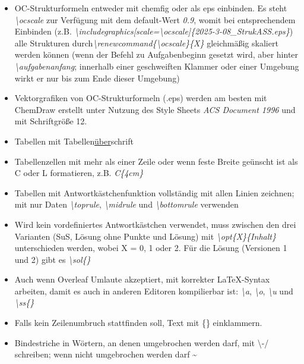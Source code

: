 \documentclass[./main.tex]{subfiles}
\begin{document}
\begin{itemize}
    \item OC-Strukturformeln entweder mit chemfig oder als eps einbinden. Es steht \textit{\textbackslash ocscale} zur Verf\"ugung mit dem default-Wert \textit{0.9}, womit bei entsprechendem Einbinden (z.B. \linebreak\textit{\textbackslash includegraphics[scale=\textbackslash ocscale]\{2025-3-08\_StrukASS.eps\}}) alle Strukturen durch\linebreak \textit{\textbackslash renewcommand\{\textbackslash ocscale\}\{X\}} gleichm\"a\ss{}ig skaliert werden k\"onnen (wenn der Befehl zu Aufgabenbeginn gesetzt wird, aber hinter \textit{\textbackslash aufgabenanfang}; innerhalb einer geschweiften Klammer oder einer Umgebung wirkt er nur bis zum Ende dieser Umgebung)
    \item Vektorgrafiken von OC-Strukturformeln (.eps) werden am besten mit ChemDraw erstellt unter Nutzung des Style Sheets \textit{ACS Document 1996} und mit Schriftgr\"o\ss{}e 12. 
    \item Tabellen mit Tabellen\underline{\"uber}schrift 
    \item Tabellenzellen mit mehr als einer Zeile oder wenn feste Breite ge\"unscht ist als C oder L formatieren, z.B. \textit{C\{4cm\}}
    \item Tabellen mit Antwortk\"astchenfunktion vollst\"andig mit allen Linien zeichnen; mit nur Daten \textit{\hypertarget{toprule}{\textbackslash toprule}}, \textit{\hypertarget{midrule}{\textbackslash midrule}} und \textit{\hypertarget{bottomrule}{\textbackslash bottomrule}} verwenden
    \item Wird kein vordefiniertes Antwortk\"astchen verwendet, muss zwischen den drei Varianten (SuS, L\"osung ohne Punkte und L\"osung) mit \textit{\textbackslash opt\{X\}\{Inhalt\}} unterschieden werden, wobei X = 0, 1 oder 2. F\"ur die L\"osung (Versionen 1 und 2) gibt es \hypertarget{sol}{\textit{\textbackslash sol\{\}}}
    \item Auch wenn Overleaf Umlaute akzeptiert, mit korrekter \LaTeX-Syntax arbeiten, damit es auch in anderen Editoren kompilierbar ist: \hypertarget{a}{\textit{\textbackslash\grqq{}a}}, \hypertarget{o}{\textit{\textbackslash\grqq{}o}}, \hypertarget{u}{\textit{\textbackslash\grqq{}u}} und \hypertarget{ss}{\textit{\textbackslash ss\{\}}}
    \item Falls kein Zeilenumbruch stattfinden soll, Text mit \{\} einklammern.  
    \item Bindestriche in W\"ortern, an denen umgebrochen werden darf, mit \textbackslash -/ schreiben; wenn nicht umgebrochen werden darf \grqq{}\textasciitilde

\end{itemize}
\end{document}
